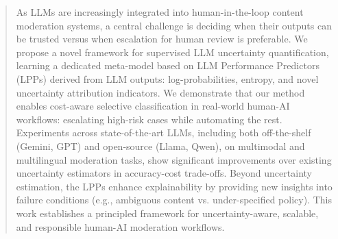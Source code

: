 \begin{abstract}
As LLMs are increasingly integrated into human-in-the-loop content moderation systems, a central challenge is deciding when their outputs can be trusted versus when escalation for human review is preferable. We propose a novel framework for supervised LLM uncertainty quantification, learning a dedicated meta-model based on LLM Performance Predictors (LPPs) derived from LLM outputs: log-probabilities, entropy, and novel uncertainty attribution indicators.
We demonstrate that our method enables cost-aware selective classification in real-world human-AI workflows: escalating high-risk cases while automating the rest. Experiments across state-of-the-art LLMs, including both off-the-shelf (Gemini, GPT) and open-source (Llama, Qwen), on multimodal and multilingual moderation tasks, show significant improvements over existing uncertainty estimators in accuracy-cost trade-offs. Beyond uncertainty estimation, the LPPs enhance explainability by providing new insights into failure conditions (e.g., ambiguous content vs. under-specified policy). This work establishes a principled framework for uncertainty-aware, scalable, and responsible human-AI moderation workflows.
\end{abstract}